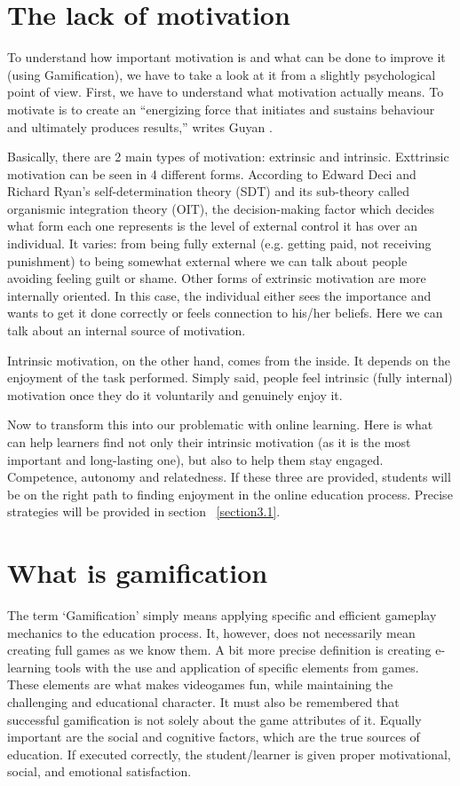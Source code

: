 \documentclass[10pt,twoside,english,a4paper]{article}
\begin{document}
\section{The lack of motivation} \label{section2}
	To understand how important motivation is and what can be done to improve it (using Gamification), we have to take a look at it from a slightly psychological point of view. First, we have to understand what motivation actually means. 
	To motivate is to create an “energizing force that initiates and sustains behaviour and ultimately produces results,” writes Guyan \cite{Guyan}. 

	Basically, there are 2 main types of motivation: extrinsic and intrinsic. Exttrinsic motivation can be seen in 4 different forms. 
	According to Edward Deci and Richard Ryan's self-determination theory (SDT) and its sub-theory called organismic integration theory (OIT), the decision-making factor which decides what form each one represents is the level of external control it has over an individual. 
	It varies: from being fully external (e.g. getting paid, not receiving punishment) to being somewhat external where we can talk about people avoiding feeling guilt or shame. Other forms of extrinsic motivation are more internally oriented. 
	In this case, the individual either sees the importance and wants to get it done correctly or feels connection to his/her beliefs. Here we can talk about an internal source of motivation.
	
	Intrinsic motivation, on the other hand, comes from the inside. It depends on the enjoyment of the task performed. Simply said, people feel intrinsic (fully internal) motivation once they do it voluntarily and genuinely enjoy it.

	Now to transform this into our problematic with online learning. Here is what can help learners find not only their intrinsic motivation (as it is the most important and long-lasting one), but also to help them stay engaged. 
	Competence, autonomy and relatedness. If these three are provided, students will be on the right path to finding enjoyment in the online education process. Precise strategies will be provided in section ~\ref{section3.1}. \cite{Guyan}




\section{What is gamification} \label{section3}
	The term ‘Gamification’ simply means applying specific and efficient gameplay mechanics to the education process. It, however, does not necessarily mean creating full games as we know them.\cite{Raymer}
	A bit more precise definition is creating e-learning tools with the use and application of specific elements from games. These elements are what makes videogames fun, while maintaining the challenging and educational character.\cite{Abu-Dawood} 
	It must also be remembered that successful gamification is not solely about the game attributes of it. Equally important are the social and cognitive factors, which are the true sources of education. \cite{Raymer}
	If executed correctly, the student/learner is given proper motivational, social, and emotional satisfaction.\cite{Abu-Dawood} 
\end{document}
